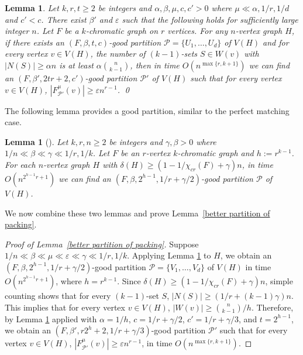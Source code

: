 \documentclass[11pt, letterpaper]{amsart}
\theoremstyle{plain}
\numberwithin{equation}{section}
\newtheorem{lemma}[thm]{Lemma}
\theoremstyle{definition}
\newcommand\card[1]{\left| #1 \right|}
\begin{document}
\begin{lemma}\label{variant of better partition}
Let $k,r,t\ge 2$ be integers and $\alpha,\beta,\mu,c,c'>0$ where $\mu\ll \alpha,1/r,1/d$ and $c'<c$.
There exist $\beta'$ and $\varepsilon$ such that the following holds for sufficiently large integer $n$. 
Let $F$ be a $k$-chromatic graph on $r$ vertices. 
For any $n$-vertex graph $H$, if there exists an $(F,\beta,t,c)$-good partition $\mathcal{P}=\{U_1,\dots,U_d\}$ of $ V(H)$ and for every vertex $v\in V(H)$, the number of $(k-1)$-sets $S\in W(v)$ with $|N(S)|\ge \alpha n$ is at least $\alpha\binom{n}{k-1}$, then in time $O(n^{\max\{r,k+1\}})$ we can find an $(F,\beta',2tr+2,c')$-good partition $\mathcal{P}'$ of $V(H)$ such that for every vertex $v\in V(H)$, $ \card{F^{\mu}_{\mathcal{P'}}(v)}\ge \varepsilon n^{r-1} $. \qed
\end{lemma}
    
The following lemma provides a good partition, similar to the perfect matching case.

\begin{lemma}[\cite{han2020complexity}]\label{good parition-F}
Let $k,r,n\ge 2$ be integers and $\gamma,\beta >0$ where $ 1/n\ll \beta\ll\gamma\ll 1/r,1/k$. 
Let $F$ be an $r$-vertex $k$-chromatic graph and $h:=r^{k-1}$. 
For each $n$-vertex graph $H$ with $\delta(H)\ge (1-1/{\chi}_{cr}(F)+\gamma)n$, in time $O(n^{2^{h-1}r+1})$ we can find an $(F,\beta,2^{h-1},1/r+\gamma/2)$-good partition $\mathcal{P}$ of $ V(H)$.
\end{lemma}

We now combine these two lemmas and prove Lemma~\ref{better partition of packing}.
\begin{proof}[Proof of Lemma~\ref{better partition of packing}]
Suppose $ 1/n\ll\beta\ll \mu\ll\varepsilon\ll\gamma\ll1/r,1/k$.
Applying Lemma \ref{good parition-F} to $H$, we obtain an $(F,\beta,2^{h-1},1/r+\gamma/2)$-good partition $\mathcal{P}=\{V_1,\dots,V_d\}$ of $ V(H)$ in time $O(n^{2^{h-1}r+1})$, where $h=r^{k-1}$.
Since $\delta(H)\ge (1-1/{\chi}_{cr}(F)+\gamma)n$, simple counting shows that for every $(k-1)$-set $S$, $|N(S)|\ge (1/r+(k-1)\gamma)n$. 
This implies that for every vertex $v\in V(H)$, $|W(v)|\ge \binom{n}{k-1}/h$. 
Therefore, by Lemma \ref{variant of better partition} applied with $\alpha=1/h$, $c=1/r+\gamma/2$, $c'=1/r+\gamma/3$, and $t=2^{h-1}$, we obtain an $(F,\beta',r2^h+2,1/r+\gamma/3)$-good partition $\mathcal{P}'$ such that for every vertex $v\in V(H)$, $ \card{F^{\mu}_{\mathcal{P'}}(v)}\ge \varepsilon n^{r-1} $, in time $O(n^{\max\{r,k+1\}})$.
\end{proof}
    
\end{document}

